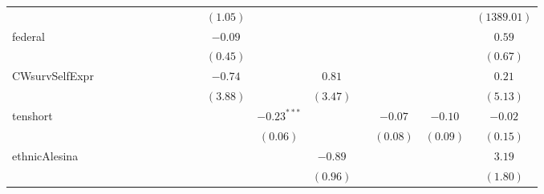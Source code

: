 \documentclass[a4paper]{article}\usepackage{graphicx, color}
\begin{document}
\begin{landscape}
\begin{table}
{{\begin{tabular}{l c c c c c c c c c c c c c c c c }
                    &               &               &               &               &               &               &               &               &               & $(1.05)$ &               &          &          &              &              & $(1389.01)$         \\
federal             &               &               &               &               &               &               &               &               &               & $-0.09$  &               &          &          &              &              & $0.59$              \\
                    &               &               &               &               &               &               &               &               &               & $(0.45)$ &               &          &          &              &              & $(0.67)$            \\
CWsurvSelfExpr      &               &               &               &               &               &               &               &               &               & $-0.74$  &               & $0.81$   &          &              &              & $0.21$              \\
                    &               &               &               &               &               &               &               &               &               & $(3.88)$ &               & $(3.47)$ &          &              &              & $(5.13)$            \\
tenshort            &               &               &               &               &               &               &               &               &               &          & $-0.23^{***}$ &          &          & $-0.07$      & $-0.10$      & $-0.02$             \\
                    &               &               &               &               &               &               &               &               &               &          & $(0.06)$      &          &          & $(0.08)$     & $(0.09)$     & $(0.15)$            \\
ethnicAlesina       &               &               &               &               &               &               &               &               &               &          &               & $-0.89$  &          &              &              & $3.19$              \\
                    &               &               &               &               &               &               &               &               &               &          &               & $(0.96)$ &          &              &              & $(1.80)$            \\

\end{tabular}}}
\end{table}
\end{landscape}
\end{document}
